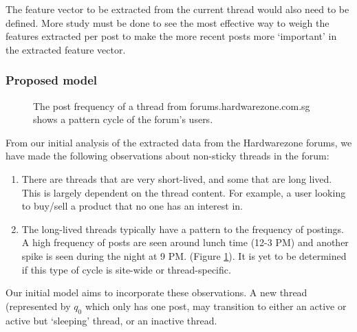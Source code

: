 \documentclass[12 pt]{article}
\begin{document}
The feature vector to be extracted from the current thread would also need to be defined. More study must be done to see the most effective way to weigh the features extracted per post to make the more recent posts more `important' in the extracted feature vector.



\subsubsection{Proposed model}
\begin{figure}\label{sleepcycle}
\caption{The post frequency of a thread from forums.hardwarezone.com.sg shows a pattern cycle of the forum's users.}
\end{figure}
From our initial analysis of the extracted data from the Hardwarezone forums, we have made the following observations about non-sticky threads in the forum:
\begin{enumerate}
	\item There are threads that are very short-lived, and some that are long lived. This is largely dependent on the thread content. For example, a user looking to buy/sell a product that no one has an interest in. %
	\item The long-lived threads typically have a pattern to the frequency of postings. A high frequency of posts are seen around lunch time (12-3 PM) and another spike is seen during the night at 9 PM. (Figure \ref{sleepcycle}). It is yet to be determined if this type of cycle is site-wide or thread-specific.
\end{enumerate}
Our initial model aims to incorporate these observations. A new thread (represented by $q_0$ which only has one post, may transition to either an active or active but `sleeping' thread, or an inactive thread.
\end{document}
